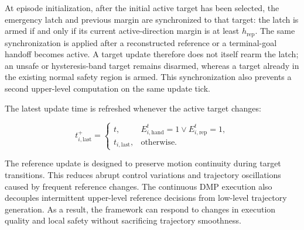At episode initialization, after the initial active target has been selected, the emergency latch and previous margin are synchronized to that target: the latch is armed if and only if its current active-direction margin is at least $h_{\mathrm{rep}}$. The same synchronization is applied after a reconstructed reference or a terminal-goal handoff becomes active. A target update therefore does not itself rearm the latch; an unsafe or hysteresis-band target remains disarmed, whereas a target already in the existing normal safety region is armed. This synchronization also prevents a second upper-level computation on the same update tick.

The latest update time is refreshed whenever the active target changes:

\begin{equation}
    \label{eq:last_reference_update}
    t_{i,\mathrm{last}}^{+}
    =
    \begin{cases}
        t,
        & E_{i,\mathrm{hand}}^t=1
        \vee
        E_{i,\mathrm{rep}}^t=1,\\
        t_{i,\mathrm{last}},
        & \mathrm{otherwise}.
    \end{cases}
\end{equation}

The reference update is designed to preserve motion continuity during target transitions. 
This reduces abrupt control variations and trajectory oscillations caused by frequent reference changes. The continuous DMP execution also decouples intermittent upper-level reference decisions from low-level trajectory generation. As a result, the framework can respond to changes in execution quality and local safety without sacrificing trajectory smoothness.



